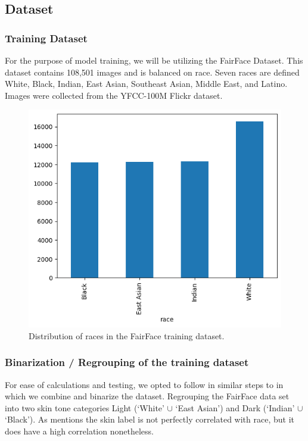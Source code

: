 \documentclass[conference]{IEEEtran}
\begin{document}
\subsection{Dataset}
\subsubsection{Training Dataset}
For the purpose of model training, we will be utilizing the FairFace Dataset\cite{karkkainen2021fairface}. This dataset contains 108,501 images and is balanced on race. Seven races are defined White, Black, Indian, East Asian, Southeast Asian, Middle East, and Latino. Images were collected from the YFCC-100M Flickr dataset\cite{thomee2016yfcc100m}.

\begin{figure}
    \centerline{\includegraphics[width=0.8\linewidth]{latex/images/fairFaceOriginalDistribution.png}}
    \caption{Distribution of races in the FairFace training dataset.}
    \label{racial_distribution}
\end{figure}

\subsubsection{Binarization / Regrouping of the training dataset}
For ease of calculations and testing, we opted to follow in similar steps to\cite{dhar2022distill} in which we combine and binarize the dataset. Regrouping the FairFace\cite{karkkainen2021fairface} data set into two skin tone categories Light (‘White’ $\cup$ ‘East Asian’) and Dark (‘Indian’ $\cup$ ‘Black’). As \cite{dhar2022distill} mentions the skin label is not perfectly correlated with race, but it does have a high correlation nonetheless. 
\end{document}
